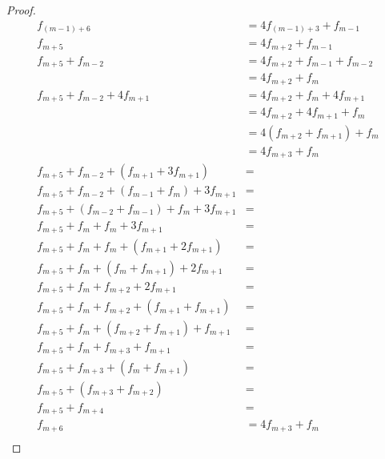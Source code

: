 \documentclass[12pt,letterpaper]{article}
\begin{document}
\begin{enumerate}
\begin{enumerate}
\begin{enumerate}
\begin{proof}
                \begin{align*}
                  f_{\left(m - 1\right) + 6} &= 4f_{\left(m - 1\right) + 3} + f_{m - 1} \\
                  f_{m + 5} &= 4f_{m + 2} + f_{m - 1} \\
                  f_{m + 5} + f_{m - 2} &= 4f_{m + 2} + f_{m - 1} + f_{m - 2} \\
                  &= 4f_{m + 2} + f_m \\
                  f_{m + 5} + f_{m - 2} + 4f_{m + 1} &= 4f_{m + 2} + f_m + 4f_{m + 1} \\
                  &= 4f_{m + 2} + 4f_{m + 1} + f_m \\
                  &= 4\left(f_{m + 2} + f_{m + 1}\right) + f_m \\
                  &= 4f_{m + 3} + f_m \\
                  f_{m + 5} + f_{m - 2} + \left(f_{m + 1} + 3f_{m + 1}\right)       &= \\
                  f_{m + 5} + f_{m - 2} + \left(f_{m - 1} + f_m\right) + 3f_{m + 1} &= \\
                  f_{m + 5} + \left(f_{m - 2} + f_{m - 1}\right) + f_m + 3f_{m + 1} &= \\
                  f_{m + 5} + f_m + f_m + 3f_{m + 1}                                &= \\
                  f_{m + 5} + f_m + f_m + \left(f_{m + 1} + 2f_{m + 1}\right)       &= \\
                  f_{m + 5} + f_m + \left(f_m + f_{m + 1}\right) + 2f_{m + 1}       &= \\
                  f_{m + 5} + f_m + f_{m + 2} + 2f_{m + 1}                          &= \\
                  f_{m + 5} + f_m + f_{m + 2} + \left(f_{m + 1} + f_{m + 1}\right)  &= \\
                  f_{m + 5} + f_m + \left(f_{m + 2} + f_{m + 1}\right) + f_{m + 1}  &= \\
                  f_{m + 5} + f_m + f_{m + 3} + f_{m + 1}                           &= \\
                  f_{m + 5} + f_{m + 3} + \left(f_m + f_{m + 1}\right)              &= \\
                  f_{m + 5} + \left(f_{m + 3} + f_{m + 2}\right)                    &= \\
                  f_{m + 5} + f_{m + 4}                                             &= \\
                  f_{m + 6}                                                         &= 4f_{m + 3} + f_m \\
                \end{align*}


\end{proof}
\end{enumerate}
\end{enumerate}
\end{enumerate}
\end{document}
